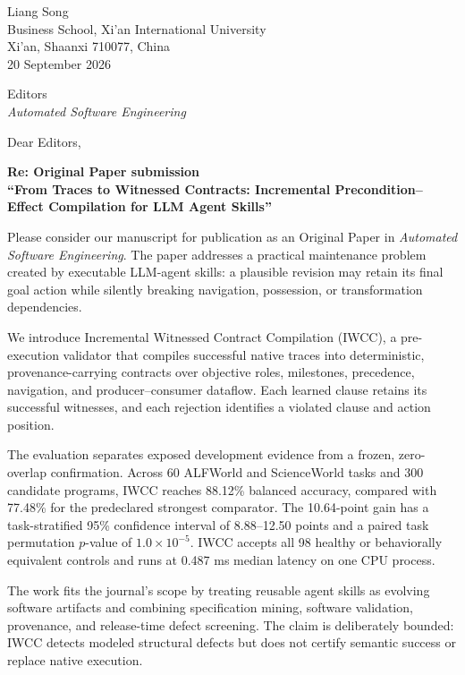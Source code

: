 \documentclass[10pt]{article}
\begin{document}
\begin{flushright}
Liang Song\\
Business School, Xi'an International University\\
Xi'an, Shaanxi 710077, China\\
20 September 2026
\end{flushright}

Editors\\
\textit{Automated Software Engineering}

Dear Editors,

\noindent\textbf{Re: Original Paper submission}\\
\textbf{``From Traces to Witnessed Contracts: Incremental Precondition--Effect
Compilation for LLM Agent Skills''}

Please consider our manuscript for publication as an Original Paper in
\textit{Automated Software Engineering}. The paper addresses a practical
maintenance problem created by executable LLM-agent skills: a plausible
revision may retain its final goal action while silently breaking navigation,
possession, or transformation dependencies.

We introduce Incremental Witnessed Contract Compilation (IWCC), a
pre-execution validator that compiles successful native traces into
deterministic, provenance-carrying contracts over objective roles, milestones,
precedence, navigation, and producer--consumer dataflow. Each learned clause
retains its successful witnesses, and each rejection identifies a violated
clause and action position.

The evaluation separates exposed development evidence from a frozen,
zero-overlap confirmation. Across 60 ALFWorld and ScienceWorld tasks and 300
candidate programs, IWCC reaches 88.12\% balanced accuracy, compared with
77.48\% for the predeclared strongest comparator. The 10.64-point gain has a
task-stratified 95\% confidence interval of 8.88--12.50 points and a paired
task permutation $p$-value of $1.0\times10^{-5}$. IWCC accepts all 98 healthy
or behaviorally equivalent controls and runs at 0.487 ms median latency on one
CPU process.

The work fits the journal's scope by treating reusable agent skills as evolving
software artifacts and combining specification mining, software validation,
provenance, and release-time defect screening. The claim is deliberately
bounded: IWCC detects modeled structural defects but does not certify semantic
success or replace native execution.
\end{document}
